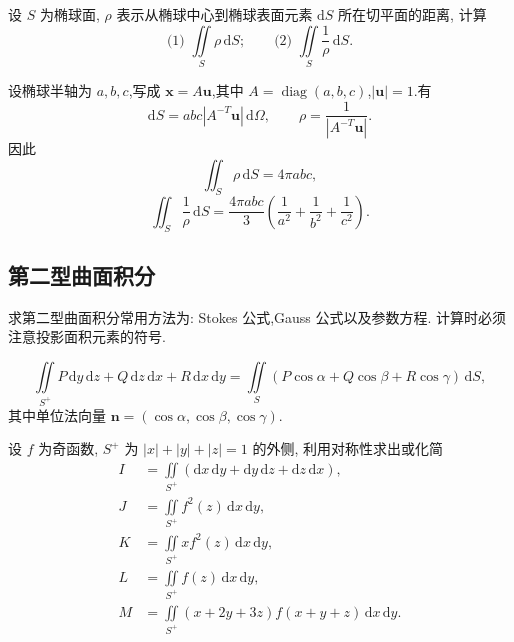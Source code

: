 \begin{example}
    设 $S$ 为椭球面, $\rho$ 表示从椭球中心到椭球表面元素 $\mathrm{d}S$ 所在切平面的距离, 计算
    \[
        \text{(1) }\iint\limits_S\rho\,\mathrm{d}S;
        \qquad
        \text{(2) }\iint\limits_S\dfrac{1}{\rho}\,\mathrm{d}S.
    \]
\end{example}
\exampleblank

\begin{solution}
    设椭球半轴为 $a,b,c$,写成 $\bm x=A\bm u$,其中 $A=\operatorname{diag}(a,b,c)$,$|\bm u|=1$.有
    \[
        \mathrm{d}S=abc|A^{-T}\bm u|\,\mathrm{d}\Omega,\qquad
        \rho=\dfrac{1}{|A^{-T}\bm u|}.
    \]
    因此
    \[
        \displaystyle\iint_S\rho\,\mathrm{d}S=4\pi abc,
    \]
    \[
        \displaystyle\iint_S\dfrac{1}{\rho}\,\mathrm{d}S
        =\dfrac{4\pi abc}{3}\left(\dfrac{1}{a^2}+\dfrac{1}{b^2}+\dfrac{1}{c^2}\right).
    \]
\end{solution}



\subsection{第二型曲面积分}

求第二型曲面积分常用方法为: Stokes 公式,Gauss 公式以及参数方程. 计算时必须注意投影面积元素的符号.

\begin{theorem}[\markstar]
    \[
        \displaystyle\iint\limits_{S^+}P\,\mathrm{d}y\,\mathrm{d}z+Q\,\mathrm{d}z\,\mathrm{d}x+R\,\mathrm{d}x\,\mathrm{d}y
        =\iint\limits_S(P\cos\alpha+Q\cos\beta+R\cos\gamma)\,\mathrm{d}S,
    \]
    其中单位法向量 $\bm n=(\cos\alpha,\cos\beta,\cos\gamma)$.
\end{theorem}

\begin{example}
    设 $f$ 为奇函数, $S^+$ 为 $|x|+|y|+|z|=1$ 的外侧, 利用对称性求出或化简
    \[
        \begin{aligned}
            I & =\iint\limits_{S^+}(\mathrm{d}x\,\mathrm{d}y+\mathrm{d}y\,\mathrm{d}z+\mathrm{d}z\,\mathrm{d}x), \\
            J & =\iint\limits_{S^+}f^2(z)\,\mathrm{d}x\,\mathrm{d}y,                                             \\
            K & =\iint\limits_{S^+}xf^2(z)\,\mathrm{d}x\,\mathrm{d}y,                                            \\
            L & =\iint\limits_{S^+}f(z)\,\mathrm{d}x\,\mathrm{d}y,                                               \\
            M & =\iint\limits_{S^+}(x+2y+3z)f(x+y+z)\,\mathrm{d}x\,\mathrm{d}y.
        \end{aligned}
    \]
\end{example}
\exampleblank

